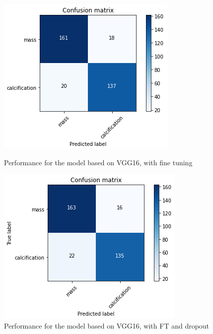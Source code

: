 \documentclass[11pt,a4paper,oneside]{article}
\begin{document}
\begin{figure}[h]
	\begin{minipage}[c]{.4\textwidth}
		\centering\setlength{\captionmargin}{0pt}%
		\includegraphics[width=.9\textwidth]{images/Task 3/VGG16 3.1/FT/Conf_Matrix}
		\caption{Performance for the model based on VGG16, with fine tuning}
		\label{fig:vgg16_3.1_matrix_ft}
	\end{minipage}
	\hspace{5mm}%
	\begin{minipage}[c]{.4\textwidth}
		\centering\setlength{\captionmargin}{0pt}%
		\includegraphics[width=.9\textwidth]{images/Task 3/VGG16 3.1/FT/Conf_Matrix_drop}
		\caption{Performance for the model based on VGG16, with FT and dropout}
		\label{fig:vgg16_3.1_matrix_ft_d}
	\end{minipage}
\end{figure}
\end{document}
